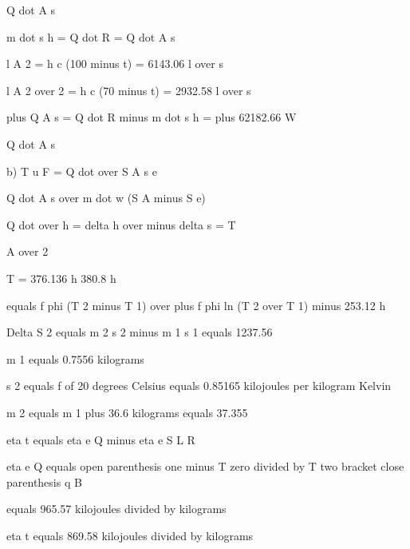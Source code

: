 Q dot A s

m dot s h = Q dot R = Q dot A s

l A 2 = h c (100 minus t) = 6143.06 l over s

l A 2 over 2 = h c (70 minus t) = 2932.58 l over s

plus Q A s = Q dot R minus m dot s h = plus 62182.66 W

Q dot A s

b) T u F = Q dot over S A s e

Q dot A s over m dot w (S A minus S e)

Q dot over h = delta h over minus delta s = T

A over 2

T = 376.136 h 380.8 h

equals f phi (T 2 minus T 1) over plus f phi ln (T 2 over T 1) minus 253.12 h

Delta S 2 equals m 2 s 2 minus m 1 s 1 equals 1237.56

m 1 equals 0.7556 kilograms

s 2 equals f of 20 degrees Celsius equals 0.85165 kilojoules per kilogram Kelvin

m 2 equals m 1 plus 36.6 kilograms equals 37.355

eta t equals eta e Q minus eta e S L R

eta e Q equals open parenthesis one minus T zero divided by T two bracket close parenthesis q B

equals 965.57 kilojoules divided by kilograms

eta t equals 869.58 kilojoules divided by kilograms